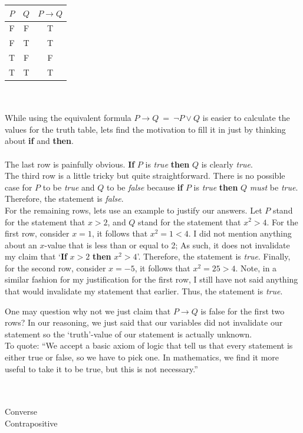 \documentclass[../setup.tex]{subfiles}
\begin{document}
\begin{center}
	\begin{tabular}[t]{| c | c | c |}
		\hline
		$P$ & $Q$ & $P\rightarrow Q$ \\
		\hline
		F & F & T \\
		F & T & T \\
		T & F & F \\ 
		T & T & T \\
		\hline
	\end{tabular}
\end{center}
\phantom \\ \\
While using the equivalent formula $P\rightarrow Q\ =\ \lnot P \lor Q$ is easier to calculate the values for the truth table, lets find the motivation to fill it in just by thinking about \textbf{if} and \textbf{then}. \\
\\
The last row is painfully obvious. \textbf{If} $P$ is \textit{true} \textbf{then} $Q$ is clearly \textit{true}. \\
The third row is a little tricky but quite straightforward. There is no possible case for $P$ to be \textit{true} and $Q$ to be \textit{false} because \textbf{if} $P$ is \textit{true} \textbf{then} $Q$ \textit{must} be \textit{true}. Therefore, the statement is \textit{false}. \\
For the remaining rows, lets use an example to justify our answers. Let $P$ stand for the statement that $x > 2$, and $Q$ stand for the statement that $x^2 > 4$. For the first row, consider $x = 1$, it follows that $x^2 = 1 < 4$. I did not mention anything about an $x$-value that is less than or equal to 2; As such, it does not invalidate my claim that `\textbf{If} $x > 2$ \textbf{then} $x^2 > 4$'. Therefore, the statement is \textit{true}. Finally, for the second row, consider $x = -5$, it follows that $x^2 = 25 > 4$. Note, in a similar fashion for my justification for the first row, I still have not said anything that would invalidate my statement that earlier. Thus, the statement is \textit{true}. 

\begin{remark}
One may question why not we just claim that $P\rightarrow Q$ is false for the first two rows? In our reasoning, we just said that our variables did not invalidate our statement so the `truth'-value of our statement is actually unknown. \\ To quote: ``We accept a basic axiom of logic that tell us that every statement is either true or false, so we have to pick one. In mathematics, we find it more useful to take it to be true, but this is not necessary.'' 
\end{remark}
\phantom \\ \\
Converse \\
Contrapositive 

\begin{theorem}
\end{theorem}
\end{document}
